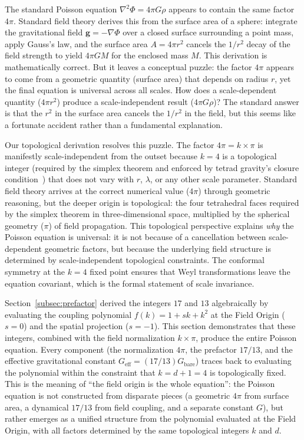 The standard Poisson equation $\nabla^2\Phi = 4\pi G\rho$ appears to contain the same factor $4\pi$. Standard field theory derives this from the surface area of a sphere: integrate the gravitational field $\mathbf{g} = -\nabla\Phi$ over a closed surface surrounding a point mass, apply Gauss's law, and the surface area $A = 4\pi r^2$ cancels the $1/r^2$ decay of the field strength to yield $4\pi G M$ for the enclosed mass $M$. This derivation is mathematically correct. But it leaves a conceptual puzzle: the factor $4\pi$ appears to come from a geometric quantity (surface area) that depends on radius $r$, yet the final equation is universal across all scales. How does a scale-dependent quantity ($4\pi r^2$) produce a scale-independent result ($4\pi G\rho$)? The standard answer is that the $r^2$ in the surface area cancels the $1/r^2$ in the field, but this seems like a fortunate accident rather than a fundamental explanation.

Our topological derivation resolves this puzzle. The factor $4\pi = k\times\pi$ is manifestly scale-independent from the outset because $k=4$ is a topological integer (required by the simplex theorem and enforced by tetrad gravity's closure condition~\cite{mtw1973,wald1984}) that does not vary with $r$, $\lambda$, or any other scale parameter. Standard field theory arrives at the correct numerical value ($4\pi$) through geometric reasoning, but the deeper origin is topological: the four tetrahedral faces required by the simplex theorem in three-dimensional space, multiplied by the spherical geometry ($\pi$) of field propagation. This topological perspective explains \emph{why} the Poisson equation is universal: it is not because of a cancellation between scale-dependent geometric factors, but because the underlying field structure is determined by scale-independent topological constraints. The conformal symmetry at the $k=4$ fixed point ensures that Weyl transformations leave the equation covariant, which is the formal statement of scale invariance.

Section~\ref{subsec:prefactor} derived the integers $17$ and $13$ algebraically by evaluating the coupling polynomial $f(k) = 1 + sk + k^2$ at the Field Origin ($s=0$) and the spatial projection ($s=-1$). This section demonstrates that these integers, combined with the field normalization $k\times\pi$, produce the entire Poisson equation. Every component (the normalization $4\pi$, the prefactor $17/13$, and the effective gravitational constant $G_{\text{eff}} = (17/13)G_{\text{bare}}$) traces back to evaluating the polynomial within the constraint that $k = d+1 = 4$ is topologically fixed. This is the meaning of ``the field origin is the whole equation'': the Poisson equation is not constructed from disparate pieces (a geometric $4\pi$ from surface area, a dynamical $17/13$ from field coupling, and a separate constant $G$), but rather emerges as a unified structure from the polynomial evaluated at the Field Origin, with all factors determined by the same topological integers $k$ and $d$.

